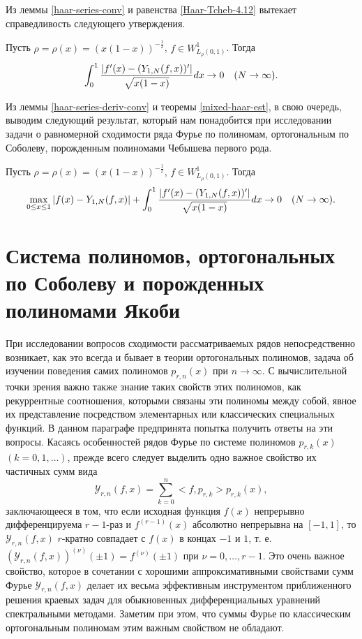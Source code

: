 Из леммы \ref{haar-series-conv}  и равенства  \eqref{Haar-Tcheb-4.12} вытекает справедливость следующего  утверждения.

\begin{lemma}\label{haar-series-deriv-conv}
Пусть $\rho=\rho(x)=(x(1-x))^{-\frac12}$,   $f\in W^1_{L_\rho(0,1)}$.
Тогда
\begin{equation*}
\int_0^1{|f'(x)-(Y_{1,N}(f,x))'|\over\sqrt{x(1-x)}}dx\to 0 \quad(N\to\infty).
\end{equation*}
\end{lemma}
Из леммы \ref{haar-series-deriv-conv} и теоремы \ref{mixed-haar-est}, в свою очередь, выводим следующий результат, который нам понадобится при исследовании задачи о равномерной сходимости ряда Фурье по полиномам, ортогональным по Соболеву, порожденным полиномами Чебышева первого рода.


\begin{proposition}\label{mixed-metric-conv}%
Пусть $\rho=\rho(x)=(x(1-x))^{-\frac12}$,   $f\in W^1_{L_\rho(0,1)}$. Тогда
$$
\max_{0\le x\le1}|f(x)-Y_{1,N}(f,x)|+
\int_0^1{|f'(x)-(Y_{1,N}(f,x))'|\over\sqrt{x(1-x)}}dx\to 0 \quad(N\to\infty).
$$
\end{proposition}

\chapter{Система полиномов, ортогональных по Соболеву и порожденных полиномами Якоби}
При исследовании вопросов сходимости рассматриваемых рядов непосредственно возникает, как это всегда и бывает в теории ортогональных полиномов, задача об изучении поведения самих полиномов $p_{r,n}(x)$ при $n\to\infty$. С вычислительной точки зрения важно также знание таких свойств этих полиномов, как рекуррентные соотношения, которыми связаны эти полиномы между собой,  явное их представление посредством элементарных или классических специальных функций. В данном параграфе предпринята попытка получить ответы на эти вопросы. Касаясь особенностей рядов Фурье по системе полиномов $p_{r,k}(x)$ $(k=0,1,\ldots)$, прежде всего следует выделить одно важное свойство их частичных сумм вида
\begin{equation}\label{sob-leg-1.2}
\mathcal{Y}_{r,n}(f,x)=\sum_{k=0}^{n}<f,p_{r,k}>p_{r,k}(x),
\end{equation}
заключающееся в том, что если исходная функция $f(x)$ непрерывно дифференцируема $r-1$-раз
и $f^{(r-1)}(x)$ абсолютно непрерывна  на $[-1,1]$, то $\mathcal{Y}_{r,n}(f,x)$ $r$-кратно совпадает с $f(x)$ в концах $-1$ и $1$, т. е.
$(\mathcal{Y}_{r,n}(f,x))^{(\nu)}(\pm1)=f^{(\nu)}(\pm1)$ при $\nu=0,\ldots,r-1$. Это очень важное свойство, которое в сочетании с хорошими аппроксимативными свойствами сумм Фурье
$\mathcal{Y}_{r,n}(f,x)$ делает их весьма эффективным инструментом приближенного решения краевых задач для обыкновенных дифференциальных уравнений спектральными методами.   Заметим при этом, что суммы Фурье по классическим ортогональным полиномам этим важным свойством не обладают.


